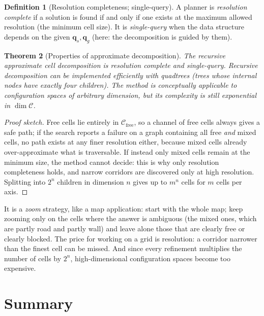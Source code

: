 \documentclass[11pt,a4paper]{article}
\newcommand{\Cspace}{\mathcal{C}}
\newcommand{\Cfree}{\mathcal{C}_{\mathrm{free}}}
\newcommand{\qs}{\boldsymbol{q}_s}
\newcommand{\qg}{\boldsymbol{q}_g}
\theoremstyle{definition}
\newtheorem{definition}{Definition}[section]
\theoremstyle{plain}
\newtheorem{theorem}[definition]{Theorem}
\theoremstyle{remark}
\begin{document}
\begin{definition}[Resolution completeness; single-query]
A planner is \emph{resolution complete} if a solution is found if and only if one exists at the maximum allowed resolution (the minimum cell size). It is \emph{single-query} when the data structure depends on the given $\qs,\qg$ (here: the decomposition is guided by them).
\end{definition}

\begin{theorem}[Properties of approximate decomposition]
\label{thm:approx-props}
The recursive approximate cell decomposition is resolution complete and single-query. Recursive decomposition can be implemented efficiently with \emph{quadtrees} (trees whose internal nodes have exactly four children). The method is conceptually applicable to configuration spaces of arbitrary dimension, but its complexity is still exponential in $\dim\Cspace$.
\end{theorem}
\begin{proof}[Proof sketch]
Free cells lie entirely in $\Cfree$, so a channel of free cells always gives a safe path; if the search reports a failure on a graph containing all free \emph{and} mixed cells, no path exists at any finer resolution either, because mixed cells already over-approximate what is traversable. If instead only mixed cells remain at the minimum size, the method cannot decide: this is why only resolution completeness holds, and narrow corridors are discovered only at high resolution. Splitting into $2^n$ children in dimension $n$ gives up to $m^n$ cells for $m$ cells per axis.
\end{proof}

\begin{intuition}
It is a \emph{zoom} strategy, like a map application: start with the whole map; keep zooming only on the cells where the answer is ambiguous (the mixed ones, which are partly road and partly wall) and leave alone those that are clearly free or clearly blocked. The price for working on a grid is resolution: a corridor narrower than the finest cell can be missed. And since every refinement multiplies the number of cells by $2^n$, high-dimensional configuration spaces become too expensive.
\end{intuition}

\section{Summary}
\end{document}
